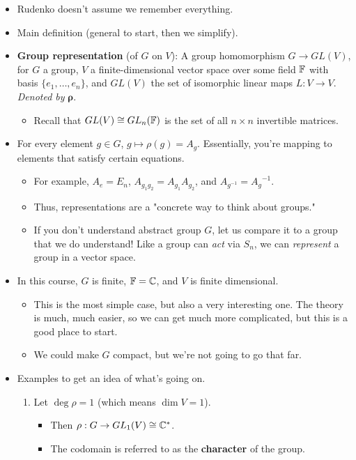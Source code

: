 \documentclass[../notes.tex]{subfiles}
\begin{document}
\begin{itemize}
    \item Rudenko doesn't assume we remember everything.
    \item Main definition (general to start, then we simplify).
    \item \textbf{Group representation} (of $G$ on $V$): A group homomorphism $G\to GL(V)$, for $G$ a group, $V$ a finite-dimensional vector space over some field $\mathbb{F}$ with basis $\{e_1,\dots,e_n\}$, and $GL(V)$ the set of isomorphic linear maps $L:V\to V$. \emph{Denoted by} $\bm{\rho}$.
    \begin{itemize}
        \item Recall that $GL(V)\cong GL_n(\mathbb{F})$ is the set of all $n\times n$ invertible matrices.
    \end{itemize}
    \item For every element $g\in G$, $g\mapsto\rho(g)=A_g$. Essentially, you're mapping to elements that satisfy certain equations.
    \begin{itemize}
        \item For example, $A_e=E_n$, $A_{g_1g_2}=A_{g_1}A_{g_2}$, and $A_{g^{-1}}={A_g}^{-1}$.
        \item Thus, representations are a "concrete way to think about groups."
        \item If you don't understand abstract group $G$, let us compare it to a group that we do understand! Like a group can \emph{act} via $S_n$, we can \emph{represent} a group in a vector space.
    \end{itemize}
    \item In this course, $G$ is finite, $\mathbb{F}=\mathbb{C}$, and $V$ is finite dimensional.
    \begin{itemize}
        \item This is the most simple case, but also a very interesting one. The theory is much, much easier, so we can get much more complicated, but this is a good place to start.
        \item We could make $G$ compact, but we're not going to go that far.
    \end{itemize}
    \item Examples to get an idea of what's going on.
    \begin{enumerate}
        \item Let $\deg\rho=1$ (which means $\dim V=1$).
        \begin{itemize}
            \item Then $\rho:G\to GL_1(V)\cong\mathbb{C}^*$.
            \item The codomain is referred to as the \textbf{character} of the group.

\end{itemize}
\end{enumerate}
\end{itemize}
\end{document}
